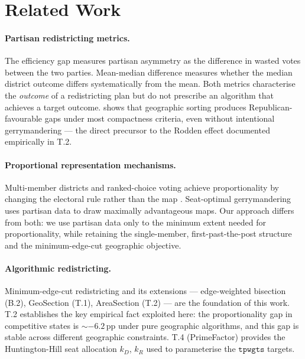 \section{Related Work}
\label{sec:related}

\paragraph{Partisan redistricting metrics.}
The efficiency gap \citep{stephanopoulos2015} measures partisan asymmetry as
the difference in wasted votes between the two parties.
Mean-median difference \citep{mcdonald2015} measures whether the median district
outcome differs systematically from the mean.
Both metrics characterise the \emph{outcome} of a redistricting plan but do
not prescribe an algorithm that achieves a target outcome.
\citet{mcghee2014} shows that geographic sorting produces Republican-favourable
gaps under most compactness criteria, even without intentional gerrymandering ---
the direct precursor to the Rodden effect documented empirically in T.2.

\paragraph{Proportional representation mechanisms.}
Multi-member districts and ranked-choice voting achieve proportionality by
changing the electoral rule rather than the map \citep{lijphart1994}.
Seat-optimal gerrymandering \citep{chen2013, friedman2009} uses partisan data
to draw maximally advantageous maps.
Our approach differs from both: we use partisan data only to the minimum extent
needed for proportionality, while retaining the single-member, first-past-the-post
structure and the minimum-edge-cut geographic objective.

\paragraph{Algorithmic redistricting.}
Minimum-edge-cut redistricting \citep{karypis1998, b1paper} and its extensions
--- edge-weighted bisection (B.2), GeoSection (T.1), AreaSection (T.2) ---
are the foundation of this work.
T.2 establishes the key empirical fact exploited here: the proportionality
gap in competitive states is $\sim$$-6.2$\,pp under pure geographic algorithms,
and this gap is stable across different geographic constraints.
T.4 (PrimeFactor) provides the Huntington-Hill seat allocation $k_D$, $k_R$
used to parameterise the $\mathtt{tpwgts}$ targets.

